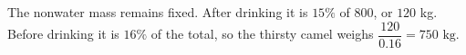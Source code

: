 The nonwater mass remains fixed. After drinking it is $15\%$ of $800$, or $120$ kg. Before drinking it is $16\%$ of the total, so the thirsty camel weighs $\dfrac{120}{0.16}=\boxed{750\text{ kg}}$.
